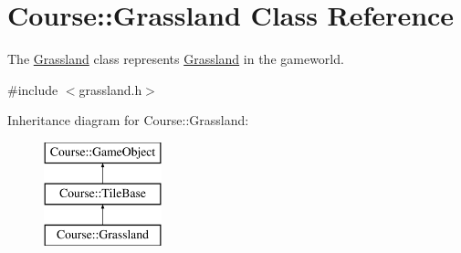 \hypertarget{classCourse_1_1Grassland}{\section{Course\-:\-:Grassland Class Reference}
\label{classCourse_1_1Grassland}
}


The \hyperlink{classCourse_1_1Grassland}{Grassland} class represents \hyperlink{classCourse_1_1Grassland}{Grassland} in the gameworld.  




{\ttfamily \#include $<$grassland.\-h$>$}

Inheritance diagram for Course\-:\-:Grassland\-:\begin{figure}[H]
\begin{center}
\leavevmode
\includegraphics[height=3.000000cm]{classCourse_1_1Grassland}
\end{center}
\end{figure}
